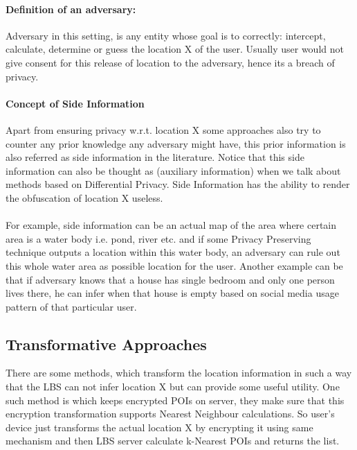 \documentclass[12pt]{report}
\theoremstyle{named}
\begin{document}
\paragraph{Definition of an adversary:}
Adversary in this setting, is any entity whose goal is to correctly: intercept, calculate, determine or guess the location X of the user. Usually user would not give consent for this release of location to the adversary, hence its a breach of privacy.

\paragraph{Concept of Side Information}
Apart from ensuring privacy w.r.t. location X some approaches also try to counter any prior knowledge any adversary might have, this prior information is also referred as side information in the literature. Notice that this side information can also be thought as (auxiliary information) when we talk about methods based on Differential Privacy. Side Information has the ability to render the obfuscation of location X useless. 


\paragraph{}
For example, side information can be an actual map of the area where certain area is a water body i.e. pond, river etc. and if some Privacy Preserving technique outputs a location within this water body, an adversary can rule out this whole water area as possible location for the user. Another example can be that if adversary knows that a house has single bedroom and only one person lives there, he can infer when that house is empty based on social media usage pattern of that particular user.

\subsection{Transformative Approaches}
There are some methods, which transform the location information in such a way that the LBS can not infer location X but can provide some useful utility. One such method is \cite{khoshgozaran2007blind} which keeps encrypted POIs on server, they make sure that this encryption transformation supports Nearest Neighbour calculations. So user's device just transforms the actual location X by encrypting it using same mechanism and then LBS server calculate k-Nearest POIs and returns the list.
\end{document}
